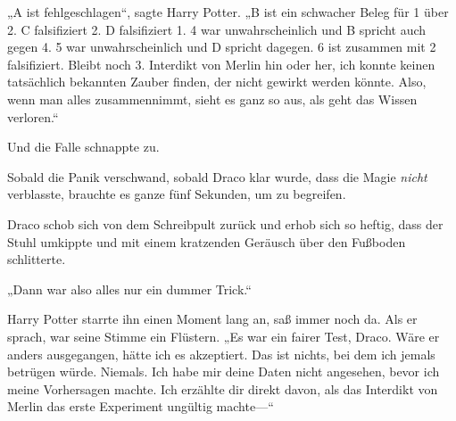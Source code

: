 „A ist fehlgeschlagen“, sagte Harry Potter.
„B ist ein schwacher Beleg für 1 über 2. C falsifiziert 2. D falsifiziert 1. 4 war unwahrscheinlich und B spricht auch gegen 4. 5 war unwahrscheinlich und D spricht dagegen. 6 ist zusammen mit 2 falsifiziert. Bleibt noch 3. Interdikt von Merlin hin oder her, ich konnte keinen tatsächlich bekannten Zauber finden, der nicht gewirkt werden könnte. Also, wenn man alles zusammennimmt, sieht es ganz so aus, als geht das Wissen verloren.“

Und die Falle schnappte zu.

Sobald die Panik verschwand, sobald Draco klar wurde, dass die Magie \emph{nicht} verblasste, brauchte es ganze fünf Sekunden, um zu begreifen.

Draco schob sich von dem Schreibpult zurück und erhob sich so heftig, dass der Stuhl umkippte und mit einem kratzenden Geräusch über den Fußboden schlitterte.

„Dann war also alles nur ein dummer Trick.“

Harry Potter starrte ihn einen Moment lang an, saß immer noch da. Als er sprach, war seine Stimme ein Flüstern.
„Es war ein fairer Test, Draco. Wäre er anders ausgegangen, hätte ich es akzeptiert. Das ist nichts, bei dem ich jemals betrügen würde. Niemals. Ich habe mir deine Daten nicht angesehen, bevor ich meine Vorhersagen machte. Ich erzählte dir direkt davon, als das Interdikt von Merlin das erste Experiment ungültig machte—“

